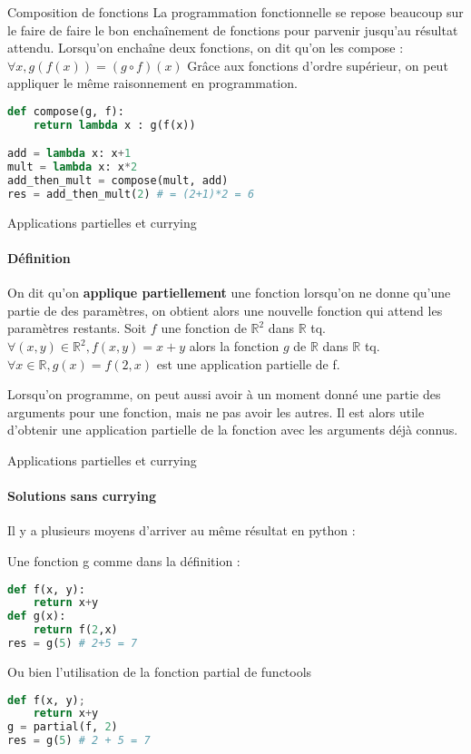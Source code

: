 \documentclass[aspectratio=169]{beamer}
\begin{document}
\begin{frame}[fragile]{Composition de fonctions}
    La programmation fonctionnelle se repose beaucoup sur le faire de faire le bon enchaînement de fonctions pour parvenir jusqu'au résultat attendu. Lorsqu'on enchaîne deux fonctions, on dit qu'on les compose : $\forall x, g(f(x)) = (g\circ f)(x)$
    Grâce aux fonctions d'ordre supérieur, on peut appliquer le même raisonnement en programmation.
    \begin{lstlisting}[language=Python]
def compose(g, f):
    return lambda x : g(f(x))

add = lambda x: x+1
mult = lambda x: x*2
add_then_mult = compose(mult, add)
res = add_then_mult(2) # = (2+1)*2 = 6
    \end{lstlisting}
\end{frame}

\begin{frame}[fragile]{Applications partielles et currying}

    \framesubtitle{Définition}

    On dit qu'on \textbf{applique partiellement} une fonction lorsqu'on ne donne qu'une partie de des paramètres, on obtient alors une nouvelle fonction qui attend les paramètres restants.
    Soit $f$ une fonction de $\mathbb{R}^2$ dans $\mathbb{R}$ tq. $\forall (x, y) \in \mathbb{R}^2, f(x, y) = x + y$ alors la fonction $g$ de $\mathbb{R}$ dans $\mathbb{R}$ tq. $\forall x \in \mathbb{R}, g(x) = f(2, x)$ est une application partielle de f.
    
    Lorsqu'on programme, on peut aussi avoir à un moment donné une partie des arguments pour une fonction, mais ne pas avoir les autres. Il est alors utile d'obtenir une application partielle de la fonction avec les arguments déjà connus.
    
\end{frame}

\begin{frame}[fragile]{Applications partielles et currying}

    \framesubtitle{Solutions sans currying}
    
    Il y a plusieurs moyens d'arriver au même résultat en python :
    
    Une fonction g comme dans la définition :
    
    \begin{lstlisting}[language=Python]
def f(x, y):
    return x+y
def g(x):
    return f(2,x)
res = g(5) # 2+5 = 7
    \end{lstlisting}

    Ou bien l'utilisation de la fonction partial de functools

    \begin{lstlisting}[language=Python]
def f(x, y);
    return x+y
g = partial(f, 2)
res = g(5) # 2 + 5 = 7
    \end{lstlisting}
    
\end{frame}
\end{document}
